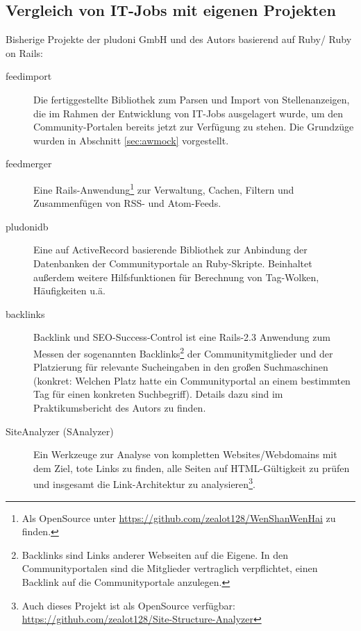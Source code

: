 \subsection{Vergleich von IT-Jobs mit eigenen Projekten}

Bisherige Projekte der pludoni GmbH und des Autors basierend auf Ruby/ Ruby on Rails:
\begin{description}
 \item[feedimport] Die fertiggestellte Bibliothek zum Parsen und Import von Stellenanzeigen, die im Rahmen der Entwicklung von IT-Jobs ausgelagert wurde, um den Community-Portalen bereits jetzt zur Verfügung zu stehen. Die Grundzüge wurden in Abschnitt \ref{sec:awmock} vorgestellt.
 \item[feedmerger] Eine Rails-Anwendung\footnote{ Als OpenSource unter \url{https://github.com/zealot128/WenShanWenHai} zu finden.} zur Verwaltung, Cachen, Filtern und Zusammenfügen von RSS- und Atom-Feeds.
 \item[pludonidb] Eine auf ActiveRecord basierende Bibliothek zur Anbindung der Datenbanken der Communityportale an Ruby-Skripte. Beinhaltet außerdem weitere Hilfsfunktionen für Berechnung von Tag-Wolken, Häufigkeiten u.ä.
 \item[backlinks] Backlink und SEO-Success-Control ist eine Rails-2.3 Anwendung zum Messen der sogenannten Backlinks\footnote{Backlinks sind Links anderer Webseiten auf die Eigene. In den Communityportalen sind die Mitglieder vertraglich verpflichtet, einen Backlink auf die Communityportale anzulegen.} der Communitymitglieder und der Platzierung für relevante Sucheingaben in den großen Suchmaschinen (konkret: Welchen Platz hatte ein Communityportal an einem bestimmten Tag für einen konkreten Suchbegriff). Details dazu sind im Praktikumsbericht des Autors zu finden. %

 \item[SiteAnalyzer (SAnalyzer)] Ein Werkzeuge zur Analyse von kompletten Websites/Webdomains mit dem Ziel, tote Links zu finden, alle Seiten auf HTML-Gültigkeit zu prüfen und insgesamt die Link-Architektur zu analysieren\footnote{Auch dieses Projekt ist als OpenSource verfügbar: \url{https://github.com/zealot128/Site-Structure-Analyzer}}.
\end{description}


